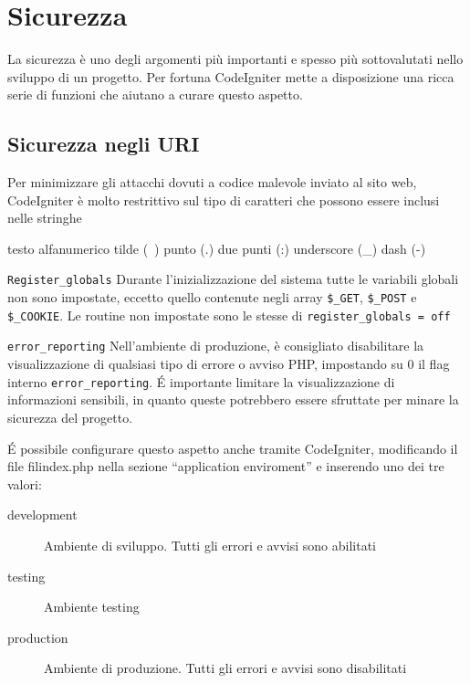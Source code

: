 \chapter{Sicurezza}
\label{cap:sicurezza}


La sicurezza è uno degli argomenti più importanti e spesso più sottovalutati nello sviluppo di un progetto. Per fortuna CodeIgniter mette a disposizione una ricca serie di funzioni che aiutano a curare questo aspetto.

\section{Sicurezza negli URI}

Per minimizzare gli attacchi dovuti a codice malevole inviato al sito web, CodeIgniter è molto restrittivo sul tipo di caratteri che possono essere inclusi nelle stringhe

\begin{code}
testo alfanumerico
tilde (~)
punto (.)
due punti (:)
underscore (_)
dash (-)
\end{code}

\verb|Register_globals|
Durante l'inizializzazione del sistema tutte le variabili globali non sono impostate, eccetto quello contenute negli array \verb|$_GET|, \verb|$_POST| e \verb|$_COOKIE|. Le routine non impostate sono le stesse di \verb|register_globals = off|

\verb|error_reporting|
Nell'ambiente di produzione, è consigliato disabilitare la visualizzazione di qualsiasi tipo di errore o avviso PHP, impostando su 0 il flag interno  \verb|error_reporting|. \'E importante limitare la visualizzazione di informazioni sensibili, in quanto queste potrebbero essere sfruttate per minare la sicurezza del progetto. 

\'E possibile configurare questo aspetto anche tramite CodeIgniter, modificando il file fil{index.php} nella sezione ``application enviroment'' e inserendo uno dei tre valori:

\begin{description}
\item [development] Ambiente di sviluppo. Tutti gli errori e avvisi sono abilitati
\item [testing] Ambiente testing
\item [production] Ambiente di produzione. Tutti gli errori e avvisi sono disabilitati
\end{description}


